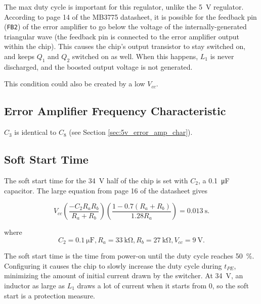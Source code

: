 \documentclass{article}
\newcommand{\Vcc}{$V_{cc}$}
\newcommand{\chippin}{\texttt}
\newcommand{\model}{\textsf}
\begin{document}


The max duty cycle is important for this regulator, unlike the
\qty{5}{\volt} regulator. According to page 14 of the \model{MB3775}
datasheet, it is possible for the feedback pin (\chippin{FB2}) of the
error amplifier to go below the voltage of the internally-generated
triangular wave (the feedback pin is connected to the error amplifier
output within the chip). This causes the chip's output transistor to
stay switched on, and keeps $Q_1$ and $Q_2$ switched on as well. When
this happens, $L_1$ is never discharged, and the boosted output
voltage is not generated.

This condition could also be created by a low \Vcc{}.
\subsection{Error Amplifier Frequency Characteristic}
$C_3$ is identical to $C_8$ (see Section \ref{sec:5v_error_amp_char}).

\subsection{Soft Start Time}
\label{sec:soft_start_time}
The soft start time for the \qty{34}{\volt} half of the chip is set
with $C_2$, a \qty{0.1}{\micro\farad} capacitor. The large equation
from page 16 of the datasheet gives

\begin{displaymath}
  V_{cc}\left(\frac{-C_2R_aR_b}{R_a+R_b}\right)\left(\frac{1-0.7(R_a+R_b)}{1.28R_a}\right)
  = \qty{0.013}{\second}.
\end{displaymath}

\noindent
where
\begin{displaymath}
  C_2 = \qty{0.1}{\micro\farad},R_a =
  \qty{33}{\kilo\ohm},R_b=\qty{27}{\kilo\ohm},V_{cc} = \qty{9}{\volt}.
\end{displaymath}

The soft start time is the time from power-on until the duty cycle
reaches \qty{50}{\%}. Configuring it causes the chip to slowly
increase the duty cycle during $t_{PE}$, minimizing the amount of
initial current drawn by the switcher. At \qty{34}{\volt}, an inductor
as large as $L_1$ draws a lot of current when it starts from 0, so the
soft start is a protection measure.
\end{document}
